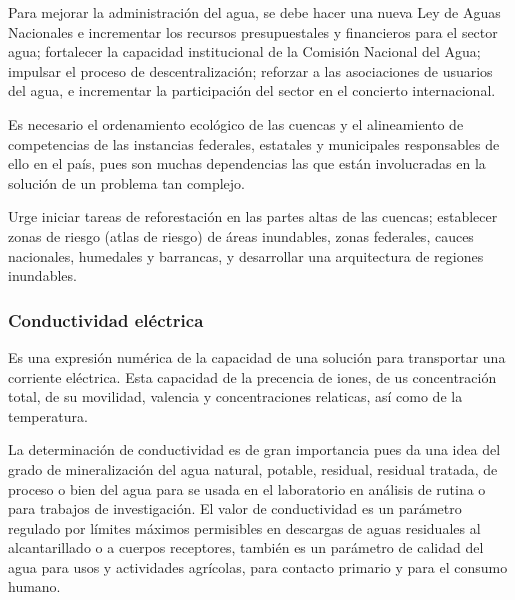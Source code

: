 Para mejorar la administración del agua, se debe hacer una nueva Ley de Aguas
Nacionales e incrementar los recursos presupuestales y financieros para el sector
agua; fortalecer la capacidad institucional de la Comisión Nacional del Agua;
impulsar el proceso de descentralización; reforzar a las asociaciones de usuarios
del agua, e incrementar la participación del sector en el concierto internacional.

Es necesario el ordenamiento ecológico de las cuencas y el alineamiento de
competencias de las instancias federales, estatales y municipales responsables de
ello en el país, pues son muchas dependencias las que están involucradas en la
solución de un problema tan complejo.

Urge iniciar tareas de reforestación en las partes altas de las cuencas; establecer zonas de riesgo (atlas de riesgo) de áreas inundables, zonas federales, cauces nacionales, humedales y barrancas, y desarrollar una arquitectura de regiones inundables.

\subsubsection{Conductividad eléctrica}
Es una expresión numérica de la capacidad de una solución para transportar una corriente eléctrica. Esta capacidad de la precencia de iones, de us concentración total, de su movilidad, valencia y concentraciones relaticas, así como de la temperatura.

La determinación de conductividad es de gran importancia pues da una idea del grado de mineralización del agua natural, potable, residual, residual tratada, de proceso o bien del agua para se usada en el laboratorio en análisis de rutina o para trabajos de investigación. El valor de conductividad es un parámetro regulado por límites máximos permisibles en descargas de aguas residuales al alcantarillado o a cuerpos receptores, también es un parámetro de calidad del agua para usos y actividades agrícolas, para contacto primario y para el consumo humano.
